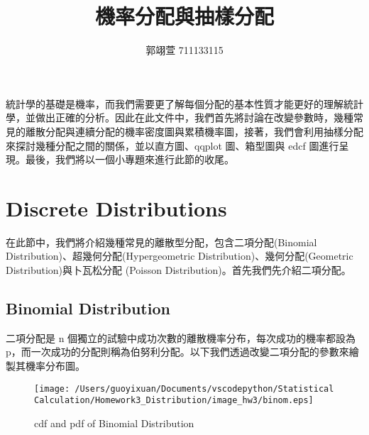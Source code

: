 \geometry{a4paper,left=2.5cm,right=2.5cm,top=2cm,bottom=2cm}
\usepackage{fancyhdr}
\pagestyle{fancy}
\fancyhf{}


\title{{\MB 機率分配與抽樣分配}}	%
\author{{\BB 郭翊萱 711133115}}				%
\date{{ }} 			
 

\maketitle
\fontsize{12}{22pt}\selectfont 

統計學的基礎是機率，而我們需要更了解每個分配的基本性質才能更好的理解統計學，並做出正確的分析。因此在此文件中，我們首先將討論在改變參數時，幾種常見的離散分配與連續分配的機率密度圖與累積機率圖，接著，我們會利用抽樣分配來探討幾種分配之間的關係，並以直方圖、qqplot 圖、箱型圖與 edcf 圖進行呈現。最後，我們將以一個小專題來進行此節的收尾。

\section{Discrete Distributions}

在此節中，我們將介紹幾種常見的離散型分配，包含二項分配(Binomial Distribution)、超幾何分配(Hypergeometric Distribution)、幾何分配(Geometric Distribution)與卜瓦松分配 (Poisson Distribution)。首先我們先介紹二項分配。

\subsection{Binomial Distribution}

二項分配是 n 個獨立的試驗中成功次數的離散機率分布，每次成功的機率都設為p，而一次成功的分配則稱為伯努利分配。以下我們透過改變二項分配的參數來繪製其機率分布圖。
\begin{figure}[H]
    \centering
        \texttt{[image: /Users/guoyixuan/Documents/vscodepython/Statistical Calculation/Homework3\_Distribution/image\_hw3/binom.eps]}
    \caption{cdf and pdf of Binomial Distribution}
    \label{fig:Binomial Distribution}
\end{figure}

